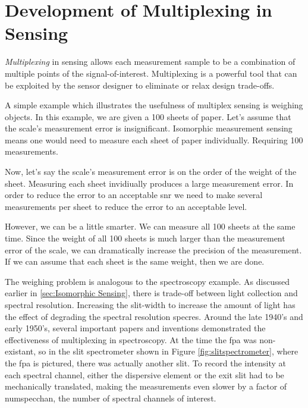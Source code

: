 \section{Development of Multiplexing in Sensing}

\emph{Multiplexing} in sensing allows each measurement sample to be a combination of multiple points of the signal-of-interest. Multiplexing is a powerful tool that can be exploited by the sensor designer to eliminate or relax design trade-offs. 

A simple example which illustrates the usefulness of multiplex sensing is weighing objects. In this example, we are given a 100 sheets of paper. Let's assume that the scale's measurement error is insignificant. Isomorphic measurement sensing means one would need to measure each sheet of paper individually. Requiring 100 measurements. 

Now, let's say the scale's measurement error is on the order of the weight of the sheet. Measuring each sheet invidiually produces a large measurement error. In order to reduce the error to an acceptable \gls{snr} we need to make several measurements per sheet to reduce the error to an acceptable level.

However, we can be a little smarter. We can measure all 100 sheets at the same time. Since the weight of all 100 sheets is much larger than the measurement error of the scale, we can dramatically increase the precision of the measurement. If we can assume that each sheet is the same weight, then we are done. 

The weighing problem is analogous to the spectroscopy example. As discussed earlier in \autoref{sec:Isomorphic Sensing}, there is trade-off between light collection and spectral resolution. Increasing the slit-width to increase the amount of light has the effect of degrading the spectral resolution \gls{specres}. Around the late 1940's and early 1950's, several important papers and inventions demonstrated the effectiveness of multiplexing in spectroscopy. At the time the \gls{fpa} was non-existant, so in the slit spectrometer shown in Figure \ref{fig:slitspectrometer}, where the \gls{fpa} is pictured, there was actually another slit. To record the intensity at each spectral channel, either the dispersive element or the exit slit had to be mechanically translated, making the measurements even slower by a factor of \gls{numspecchan}, the number of spectral channels of interest. 

